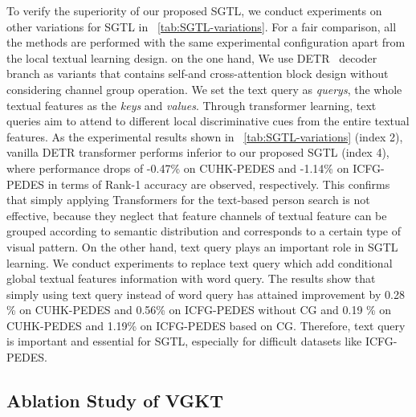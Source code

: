 To verify the superiority of our proposed SGTL, we conduct experiments on other variations for SGTL in \tablename~\ref{tab:SGTL-variations}.
For a fair comparison, all the methods are performed with the same experimental configuration apart from the local textual learning design.
on the one hand,
We use DETR~\cite{detr} decoder branch as variants that contains self-and cross-attention block design without considering channel group operation. We set the text query as \textit{querys}, the whole textual features  as the \textit{keys} and \textit{values}. Through transformer learning, text queries aim to attend to different local discriminative cues from the entire textual features.
As the experimental results shown in \tablename~\ref{tab:SGTL-variations} (index 2), vanilla DETR transformer performs inferior to our proposed SGTL (index 4), where performance drops of -0.47\% on CUHK-PEDES and -1.14\% on ICFG-PEDES in terms of Rank-1 accuracy are observed, respectively. This confirms that simply applying Transformers for the text-based person search is not effective, because they neglect that feature channels
of textual feature can be grouped according to semantic
distribution and corresponds to a certain type of visual pattern.
On the other hand, text query plays an important role in SGTL learning. We conduct experiments to replace text query which add conditional global textual features information with word query. The results show that simply using text query instead of word query has attained improvement by 0.28 \% on CUHK-PEDES and 0.56\% on ICFG-PEDES without CG and 0.19 \% on CUHK-PEDES and 1.19\% on ICFG-PEDES based on CG. Therefore, text query is important and essential for SGTL, especially for difficult datasets like ICFG-PEDES.




\subsection{Ablation Study of VGKT}

